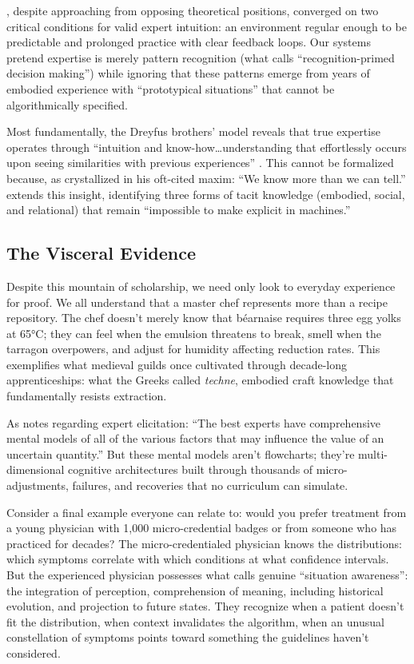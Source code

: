 \citet{kahneman2009}, despite approaching from opposing theoretical positions, converged on two critical conditions for valid expert intuition: an environment regular enough to be predictable and prolonged practice with clear feedback loops. Our systems pretend expertise is merely pattern recognition (what \citet{klein1993} calls ``recognition-primed decision making'') while ignoring that these patterns emerge from years of embodied experience with ``prototypical situations'' that cannot be algorithmically specified.

Most fundamentally, the Dreyfus brothers' model reveals that true expertise operates through ``intuition and know-how\ldots understanding that effortlessly occurs upon seeing similarities with previous experiences'' \citep{pena2010}. This cannot be formalized because, as \citet{polanyi1966} crystallized in his oft-cited maxim: ``We know more than we can tell.'' \citet{collins2010} extends this insight, identifying three forms of tacit knowledge (embodied, social, and relational) that remain ``impossible to make explicit in machines.''

\subsection{The Visceral Evidence}

Despite this mountain of scholarship, we need only look to everyday experience for proof. We all understand that a master chef represents more than a recipe repository. The chef doesn't merely know that béarnaise requires three egg yolks at 65°C; they can feel when the emulsion threatens to break, smell when the tarragon overpowers, and adjust for humidity affecting reduction rates. This exemplifies what medieval guilds once cultivated through decade-long apprenticeships: what the Greeks called \emph{techne}, embodied craft knowledge that fundamentally resists extraction.

As \citet{morgan2014} notes regarding expert elicitation: ``The best experts have comprehensive mental models of all of the various factors that may influence the value of an uncertain quantity.'' But these mental models aren't flowcharts; they're multi-dimensional cognitive architectures built through thousands of micro-adjustments, failures, and recoveries that no curriculum can simulate.

Consider a final example everyone can relate to: would you prefer treatment from a young physician with 1,000 micro-credential badges or from someone who has practiced for decades? The micro-credentialed physician knows the distributions: which symptoms correlate with which conditions at what confidence intervals. But the experienced physician possesses what \citet{endsley1995} calls genuine ``situation awareness'': the integration of perception, comprehension of meaning, including historical evolution, and projection to future states. They recognize when a patient doesn't fit the distribution, when context invalidates the algorithm, when an unusual constellation of symptoms points toward something the guidelines haven't considered.

